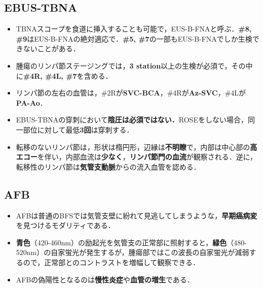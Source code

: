 \subsection{EBUS-TBNA}
\begin{itemize}
\item TBNAスコープを食道に挿入することも可能で，EUS-B-FNAと呼ぶ．\textbf{\#8, \#9}はEUS-B-FNAの絶対適応で．\textbf{\#5, \#7}の一部もEUS-B-FNAでしか生検できないことがある．
\item 腫瘍のリンパ節ステージングでは，\textbf{3 station}以上の生検が必須で，その中に\textbf{\#4R, \#4L, \#7}を含める．
\item リンパ節の左右の血管は，\#2Rが\textbf{SVC-BCA}，\#4Rが\textbf{Az-SVC}，\#4Lが\textbf{PA-Ao}．
\item EBUS-TBNAの穿刺において\textbf{陰圧は必須ではない．}ROSEをしない場合，同一部位に対して最低\textbf{3回}は穿刺する．
\item 転移のないリンパ節は，形状は楕円形，辺縁は\textbf{不明瞭}で，内部は中心部の\textbf{高エコー}を伴い，内部血流は\textbf{少なく}，\textbf{リンパ節門の血流}が観察される．逆に，転移性のリンパ節は\textbf{気管支動脈}からの流入血管を認める．
\end{itemize}

\subsection{AFB}

\begin{itemize}

\item AFBは普通のBFSでは気管支壁に紛れて見逃してしまうような，\textbf{早期癌病変}を見つけるモダリティである．

\item \textbf{青色}（420-460nm）の励起光を気管支の正常部に照射すると，\textbf{緑色}（480-520nm）の自家蛍光が発生するが，腫瘍部ではこの波長の自家蛍光が減弱するので，正常部とのコントラストを増幅して観察できる．
\item AFBの偽陽性となるのは\textbf{慢性炎症}や\textbf{血管の増生}である．
\end{itemize}

